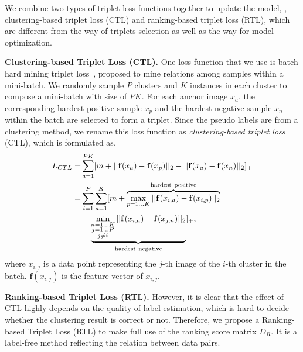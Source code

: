 \documentclass[10pt,twocolumn,letterpaper]{article}
\begin{document}
We combine two types of triplet loss functions together to update the model, \ie,  clustering-based triplet loss (CTL) and ranking-based triplet loss (RTL), which are different from the way of triplets selection as well as the way for model optimization. 

\textbf{Clustering-based Triplet Loss (CTL).} One loss function that we use is batch hard mining triplet loss~\cite{batchhardtriplet}, proposed to mine relations among samples within a mini-batch. We randomly sample $P$ clusters and $K$ instances in each cluster to compose a mini-batch with size of $PK$. For each anchor image $x_a$, the corresponding hardest positive sample $x_p$ and the hardest negative sample $x_n$ within the batch are selected to form a triplet. Since the pseudo labels are from a clustering method, we rename this loss function as \emph{clustering-based triplet loss} (CTL), which is formulated as,
\begin{equation}
\setlength{\abovedisplayskip}{0.1cm}
\setlength{\belowdisplayskip}{0.1cm}
\begin{aligned}
L_{CTL} = & \sum_{a=1}^{PK}[m + ||\mathbf{f}(x_a)-\mathbf{f}(x_p)||_2 - ||\mathbf{f}(x_a)-\mathbf{f}(x_n)||_2]_+\\
= &\sum_{i=1}^P\sum_{a=1}^K[m +  \overbrace{\max_{p=1...K}||\mathbf{f}(x_{i,a})-\mathbf{f}(x_{i,p})||_2}^{\rm hardest \ positive} \\ 
&- \underbrace{\min_{\substack{n=1...K\\
{j=1...P}\\
j \neq i}} ||\mathbf{f}(x_{i,a})-\mathbf{f}(x_{j,n})||_{2}}_{\rm hardest \ negative}]_+,
\end{aligned}
\label{eq:CTL}
\end{equation}
where $x_{i,j}$ is a data point representing the $j$-th image of the $i$-th cluster in the batch. $\mathbf{f}(x_{i,j})$ is the feature vector of $x_{i,j}$. 

\textbf{Ranking-based Triplet Loss (RTL).}
However, it is clear that the effect of CTL highly depends on the quality of label estimation, which is hard to decide whether the clustering result is correct or not. 
Therefore, we propose a Ranking-based Triplet Loss (RTL) to make full use of the ranking score matrix $D_R$. It is a label-free method reflecting the relation between data pairs.
\end{document}
